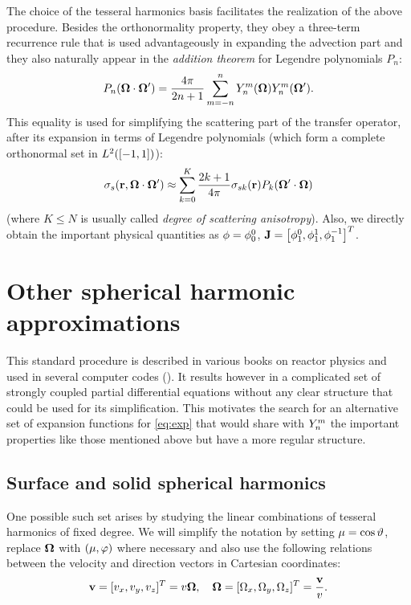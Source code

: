 The choice of the tesseral harmonics basis facilitates the realization of the above procedure. Besides the
orthonormality property, they obey a three-term recurrence rule that is used advantageously in expanding the advection
part
and they also naturally appear in the \textit{addition theorem} for Legendre polynomials $P_n$:
\begin{equation}\label{eq:addition}
  P_n(\bomega\cdot\bomega') = \frac{4\pi}{2n+1}\suma[m]{-n}{n}\Y{n}{m}(\bomega)\Y{n}{m}(\bomega').
\end{equation}
This equality is used for simplifying the scattering part of the transfer operator, after its expansion in terms of 
Legendre polynomials (which form a complete orthonormal set in $\Lp[2]([-1,1])$):
\begin{equation}\label{eq:exp2}
  \sigma_s(\br,\bomega\cdot\bomega') \approx \suma[k]{0}{K}
      \frac{2k+1}{4\pi}\sigma_{sk}(\br)P_k(\bomega'\cdot\bomega)
\end{equation}
(where $K \leq N$ is usually called \textit{degree of scattering anisotropy}).
Also, we directly obtain the important physical quantities as $\phi = \angmom{0}{0}$, $\mathbf{J} = \bigl[\angmom{1}{0},\angmom{1}{1},\angmom{1}{-1}\bigr]^T$.

\section{Other spherical harmonic approximations}
This standard procedure is described in various books on reactor physics and used in several computer codes
(\cite{MARC,Capilla,vanCriekingen1}). It results however in a complicated set of strongly coupled partial differential
equations without any clear structure that could be used for its simplification. This motivates the search for an
alternative set of expansion functions for \eqref{eq:exp} that would share with $\Y{n}{m}$ the important properties like
those mentioned above but have a more regular structure.

\subsection{Surface and solid spherical harmonics}
One possible such set arises by studying the linear combinations of tesseral harmonics of fixed degree. We will simplify
the notation by setting $\mu = \cost$, replace $\bomega$ with $(\mu, \azimuthal)$ where necessary and also use the
following relations between the velocity and direction vectors in Cartesian coordinates:
$$
  \bv = [v_x, v_y, v_z]^T = v\bomega,\quad \bomega = [\Omega_x, \Omega_y, \Omega_z]^T = \frac{\bv}{v}.
$$

